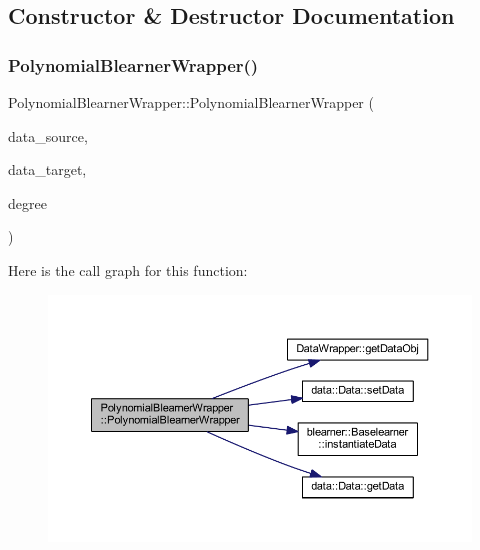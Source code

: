 \subsection{Constructor \& Destructor Documentation}
\mbox{\label{class_polynomial_blearner_wrapper_a07ad5a828b4a46bb2f6a2a6fc56b8f1a}} 
\subsubsection{\texorpdfstring{Polynomial\+Blearner\+Wrapper()}{PolynomialBlearnerWrapper()}}
{\footnotesize\ttfamily Polynomial\+Blearner\+Wrapper\+::\+Polynomial\+Blearner\+Wrapper (\begin{DoxyParamCaption}\item[{\mbox{\hyperlink{class_data_wrapper}{Data\+Wrapper}} \&}]{data\+\_\+source,  }\item[{\mbox{\hyperlink{class_data_wrapper}{Data\+Wrapper}} \&}]{data\+\_\+target,  }\item[{unsigned int}]{degree }\end{DoxyParamCaption})\hspace{0.3cm}{\ttfamily [inline]}}

Here is the call graph for this function\+:
\nopagebreak
\begin{figure}[H]
\begin{center}
\leavevmode
\includegraphics[width=350pt]{class_polynomial_blearner_wrapper_a07ad5a828b4a46bb2f6a2a6fc56b8f1a_cgraph}
\end{center}
\end{figure}


